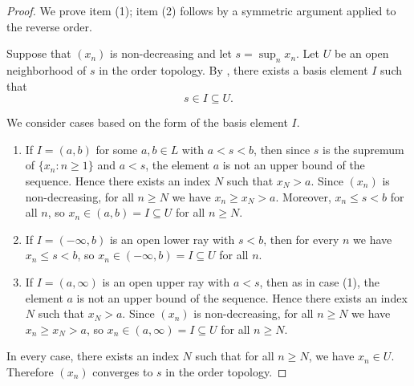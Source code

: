 \begin{proof}
    We prove item (1); item (2) follows by a symmetric argument applied to the reverse order.

    Suppose that $(x_n)$ is non-decreasing and let $s = \sup_{n} x_n$. Let $U$ be an open neighborhood of $s$ in the order topology. By , there exists a basis element $I$ such that
    $$s \in I \subseteq U.$$

    We consider cases based on the form of the basis element $I$.
    \begin{enumerate}
        \item If $I = (a, b)$ for some $a, b \in L$ with $a < s < b$, then since $s$ is the supremum of $\{x_n : n \geq 1\}$ and $a < s$, the element $a$ is not an upper bound of the sequence. Hence there exists an index $N$ such that $x_N > a$. Since $(x_n)$ is non-decreasing, for all $n \geq N$ we have $x_n \geq x_N > a$. Moreover, $x_n \leq s < b$ for all $n$, so $x_n \in (a, b) = I \subseteq U$ for all $n \geq N$.

        \item If $I = (-\infty, b)$ is an open lower ray with $s < b$, then for every $n$ we have $x_n \leq s < b$, so $x_n \in (-\infty, b) = I \subseteq U$ for all $n$.

        \item If $I = (a, \infty)$ is an open upper ray with $a < s$, then as in case (1), the element $a$ is not an upper bound of the sequence. Hence there exists an index $N$ such that $x_N > a$. Since $(x_n)$ is non-decreasing, for all $n \geq N$ we have $x_n \geq x_N > a$, so $x_n \in (a, \infty) = I \subseteq U$ for all $n \geq N$.
    \end{enumerate}

    In every case, there exists an index $N$ such that for all $n \geq N$, we have $x_n \in U$. Therefore $(x_n)$ converges to $s$ in the order topology.
\end{proof}
